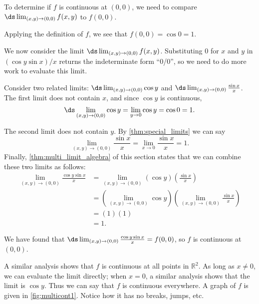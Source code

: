 {To determine if $f$ is continuous at $(0,0)$, we need to compare $\ds\lim_{(x,y)\to (0,0)} f(x,y)$ to $f(0,0)$. 

Applying the definition of $f$, we see that $f(0,0) = \cos 0 = 1$. 

We now consider the limit $\ds \lim_{(x,y)\to (0,0)} f(x,y)$. Substituting $0$ for $x$ and $y$ in $(\cos y\sin x)/x$ returns the indeterminate form ``0/0'', so we need to do more work to evaluate this limit.

Consider two related limits: $\ds \lim_{(x,y)\to (0,0)} \cos y$ and $\ds \lim_{(x,y)\to(0,0)} \frac{\sin x}x$. The first limit does not contain $x$, and since $\cos y$ is continuous,
\[\ds \lim_{(x,y)\to (0,0)} \cos y =\lim_{y\to 0} \cos y = \cos 0 = 1.\]

The second limit does not contain $y$. By \autoref{thm:special_limits} we can say
\[\lim_{(x,y)\to (0,0)} \frac{\sin x}{x} = \lim_{x\to 0} \frac{\sin x}{x} = 1.\]
Finally, \autoref{thm:multi_limit_algebra} of this section states that we can combine these two limits as follows:
\begin{align*}
\lim_{(x,y)\to (0,0)} \frac{\cos y\sin x}{x} &= \lim_{(x,y)\to (0,0)} (\cos y)\left(\frac{\sin x}{x}\right) \\ 
&=\left(\lim_{(x,y)\to (0,0)} \cos y\right)\left(\lim_{(x,y)\to (0,0)} \frac{\sin x}{x}\right) \\
  &= (1)(1)\\
	&=1.
\end{align*}

We have found that $\ds \lim_{(x,y)\to (0,0)} \frac{\cos y\sin x}{x} = f(0,0)$, so $f$ is continuous at $(0,0)$.


A similar analysis shows that $f$ is continuous at all points in $\mathbb{R}^2$. As long as $x\neq0$, we can evaluate the limit directly; when $x=0$, a similar analysis shows that the limit is $\cos y$. Thus we can say that $f$ is continuous everywhere. A graph of $f$ is given in \autoref{fig:multicont1}. Notice how it has no breaks, jumps, etc.}

